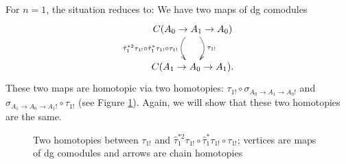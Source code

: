 For $n=1$, the situation reduces to: 
We have two maps of dg comodules
$$
\xymatrix{
C(A_0 \to A_1 \to A_0) 
 \ar@/^1pc/[d]^{\tau_{1!}}
 \ar@/_1pc/[d]_{\hat{\tau}_1^{*2} \tau_{1!}\circ
   \hat{\tau}_1^*\tau_{1!}\circ \tau_{1!}}\\
C(A_1 \to A_0 \to A_1).
}
$$
These two maps are homotopic via 
two homotopies: 
$\tau_{1!} \circ \sigma_{A_0 \to A_1 \to A_0!}$ 
and 
$\sigma_{A_1 \to A_0 \to A_1!} \circ \tau_{1!}$ 
(see Figure \ref{fig:two_homotopies_1}). Again, we will 
show that these two homotopies are the same. 
%
\begin{figure}
\xymatrixcolsep{5pc}
\centerline{}
\caption{Two homotopies between 
$\tau_{1!}$ and $\hat{\tau}_1^{*2} \tau_{1!}\circ
\hat{\tau}_1^*\tau_{1!}\circ \tau_{1!}$;
vertices are maps of dg comodules and 
arrows are chain homotopies}
\label{fig:two_homotopies_1}
\end{figure}

